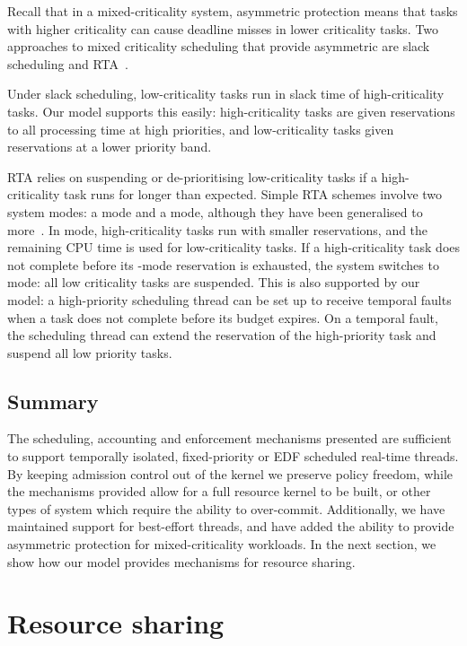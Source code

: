Recall that in a mixed-criticality system, asymmetric protection means that tasks with higher
criticality can cause deadline misses in lower criticality tasks.  Two approaches to mixed
criticality scheduling that provide asymmetric are slack scheduling and
\gls{RTA}~\citep{Burns_Davis_17}.

Under slack scheduling, low-criticality tasks run in slack time of high-criticality tasks.  Our
model supports this easily: high-criticality tasks are given reservations to all processing time at
high priorities, and low-criticality tasks given reservations at a lower priority band.

\gls{RTA} relies on suspending or de-prioritising low-criticality tasks if a high-criticality
task runs for longer than expected.  Simple \gls{RTA} schemes involve two system modes:
a  mode and a  mode, although they have been generalised to
more~\citep{Fleming_Burns_13}.  In  mode, high-criticality tasks run with smaller 
reservations, and the remaining
CPU time is used for low-criticality tasks.  If a high-criticality task does not complete before its
-mode reservation is exhausted, the system switches to  mode: all low criticality
tasks are suspended.  This is also supported by our model: a high-priority scheduling thread can be
set up to receive temporal faults when a task does not complete before its budget expires.  On a
temporal fault, the scheduling thread can extend the reservation of the high-priority task and
suspend all low priority tasks.

\subsection{Summary}

The scheduling, accounting and enforcement mechanisms presented are sufficient to support temporally
isolated, fixed-priority or \gls{EDF} scheduled real-time threads. By keeping admission control
out of the kernel we preserve policy freedom, while the mechanisms provided allow for a full
resource kernel to be built, or other types of system which require the ability to over-commit.
Additionally, we have maintained
support for best-effort threads, and have added the ability to provide asymmetric protection for
mixed-criticality workloads. 
In the next section, we show how our model provides mechanisms for resource sharing. 

\section{Resource sharing}\label{s:locking}

